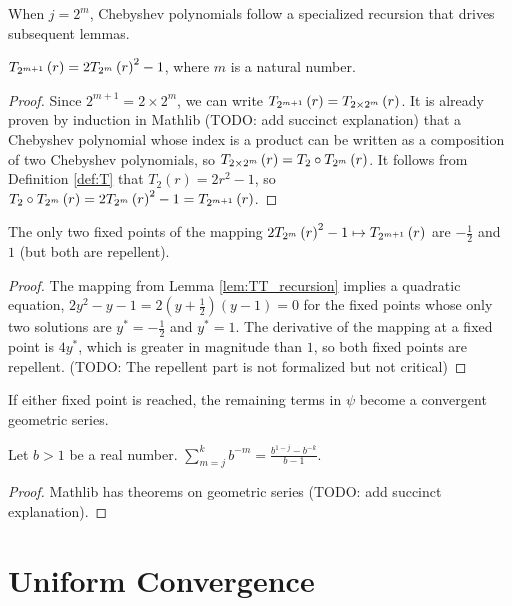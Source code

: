 When $j = 2^m$, Chebyshev polynomials follow a specialized recursion that drives subsequent lemmas.
\begin{lemma}[Doubling]
  \label{lem:TT_recursion}
  \leanok
  $T_{2^{m + 1}}\left(r\right) = 2T_{2^{m}}\left(r\right)^2 - 1$, where $m$ is a natural number.
\end{lemma}
  
\begin{proof}
  \leanok
  Since $2^{m + 1} = 2 \times 2^m$, we can write $T_{2^{m + 1}}\left(r\right) = T_{2 \times 2^m}\left(r\right)$. It is already proven by induction in Mathlib (TODO: add succinct explanation) that a Chebyshev polynomial whose index is a product can be written as a composition of two Chebyshev polynomials, so $T_{2 \times 2^m}\left(r\right) = T_2 \circ T_{2^{m}}\left(r\right)$. It follows from Definition \ref{def:T} that $T_2\left(r\right) = 2r^2 - 1$, so $T_2 \circ T_{2^{m}}\left(r\right) = 2T_{2^{m}}\left(r\right)^2 - 1 = T_{2^{m + 1}}\left(r\right)$.
\end{proof}

\begin{lemma}
  \label{lem:fixed_points}
  \leanok
  The only two fixed points of the mapping $2 T_{2^{m}}\left(r\right)^2 - 1 \mapsto T_{2^{m + 1}}\left(r\right)$ are $-\frac{1}{2}$ and $1$ (but both are repellent).
\end{lemma}

\begin{proof}
  \leanok
  The mapping from Lemma \ref{lem:TT_recursion} implies a quadratic equation, $2y^2 - y - 1 = 2\left(y + \frac{1}{2}\right)\left(y - 1\right) = 0$ for the fixed points whose only two solutions are $y^\ast = -\frac{1}{2}$ and $y^\ast = 1$. The derivative of the mapping at a fixed point is $4y^\ast$, which is greater in magnitude than $1$, so both fixed points are repellent. (TODO: The repellent part is not formalized but not critical)
\end{proof}
\noindent If either fixed point is reached, the remaining terms in $\psi$ become a convergent geometric series.
\begin{lemma}
  \label{lem:geometric}
  Let $b > 1$ be a real number. $\sum\limits_{m = j}^k b^{-m} = \frac{b^{1 - j} - b^{-k}}{b - 1}$.
\end{lemma}
\begin{proof}
  Mathlib has theorems on geometric series (TODO: add succinct explanation).
\end{proof}

\section{Uniform Convergence}\label{sec:UniformConvergence}

